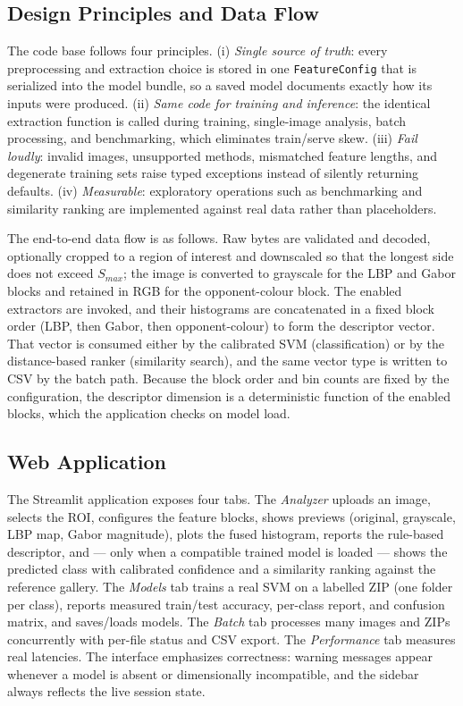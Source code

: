 \documentclass[conference]{IEEEtran}
\begin{document}
\subsection{Design Principles and Data Flow}
The code base follows four principles. (i) \emph{Single source of truth}:
every preprocessing and extraction choice is stored in one
\texttt{FeatureConfig} that is serialized into the model bundle, so a saved
model documents exactly how its inputs were produced. (ii) \emph{Same code
for training and inference}: the identical extraction function is called
during training, single-image analysis, batch processing, and benchmarking,
which eliminates train/serve skew. (iii) \emph{Fail loudly}: invalid images,
unsupported methods, mismatched feature lengths, and degenerate training
sets raise typed exceptions instead of silently returning defaults. (iv)
\emph{Measurable}: exploratory operations such as benchmarking and
similarity ranking are implemented against real data rather than
placeholders.

The end-to-end data flow is as follows. Raw bytes are validated and decoded,
optionally cropped to a region of interest and downscaled so that the
longest side does not exceed $S_{max}$; the image is converted to grayscale
for the LBP and Gabor blocks and retained in RGB for the opponent-colour
block. The enabled extractors are invoked, and their histograms are
concatenated in a fixed block order (LBP, then Gabor, then
opponent-colour) to form the descriptor vector. That vector is consumed
either by the calibrated SVM (classification) or by the distance-based
ranker (similarity search), and the same vector type is written to CSV by
the batch path. Because the block order and bin counts are fixed by the
configuration, the descriptor dimension is a deterministic function of the
enabled blocks, which the application checks on model load.

\subsection{Web Application}
The Streamlit application exposes four tabs. The \emph{Analyzer} uploads an
image, selects the ROI, configures the feature blocks, shows previews
(original, grayscale, LBP map, Gabor magnitude), plots the fused histogram,
reports the rule-based descriptor, and --- only when a compatible trained
model is loaded --- shows the predicted class with calibrated confidence
and a similarity ranking against the reference gallery. The \emph{Models}
tab trains a real SVM on a labelled ZIP (one folder per class), reports
measured train/test accuracy, per-class report, and confusion matrix, and
saves/loads models. The \emph{Batch} tab processes many images and ZIPs
concurrently with per-file status and CSV export. The \emph{Performance}
tab measures real latencies. The interface emphasizes correctness: warning
messages appear whenever a model is absent or dimensionally incompatible,
and the sidebar always reflects the live session state.
\end{document}
